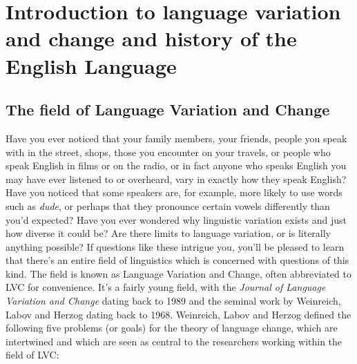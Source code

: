 \chapter[head={Introduction to language variation and change and history}]{Introduction to language variation and change and history of the English Language}\label{introduction}
\section{The field of Language Variation and Change}
Have you ever noticed that your family members, your friends, people you speak with in the street, shops, those you encounter on your travels, or people who speak English in films or on the radio, or in fact anyone who speaks English you may have ever listened to or overheard, vary in exactly how they speak English? Have you noticed that some speakers are, for example, more likely to use words such as \emph{dude}, or perhaps that they pronounce certain vowels differently than you'd expected? Have you ever wondered why linguistic variation exists and just how diverse it could be? Are there limits to language variation, or is literally anything possible? If questions like these intrigue you, you'll be pleased to learn that there's an entire field of linguistics which is concerned with questions of this kind. The field is known as Language Variation and Change, often abbreviated to LVC for convenience. It's a fairly young field, with the \textit{Journal of Language Variation and Change} dating back to 1989 and the seminal work by Weinreich, Labov and Herzog dating back to 1968. Weinreich, Labov and Herzog \citeyearpar[183--7 in particular]{WeinreichLabovHerzog1968} defined the following five problems (or goals) for the theory of language change, which are intertwined and which are seen as central to the researchers working within the field of LVC:
